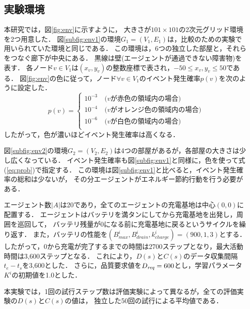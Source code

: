 \documentclass[12pt,a4j,twoside]{jarticle}
\def\AgentSet{A}
\def\Dreq{{D_{\it req}}}
\begin{document}
  \subsection{実験環境}
  本研究では，図\ref{fig:env}に示すように，
  大きさが$101 \times 101$の2次元グリッド環境を2つ用意した．
  図\ref{subfig:env1}の環境$G_1=(V_1, E_1)$は，比較のため\cite{Wu2019}の実験で用いられていた環境と同じである．
  この環境は，6つの独立した部屋と，それらをつなぐ廊下が中央にある．
  黒線は壁(エージェントが通過できない障害物)を表す．
  各ノード$v \in V_1$は$(x_v, y_v)$の整数座標で表され，$-50 \leq x_v,y_v \leq 50$である．
  図\ref{fig:env}の色に従って，ノード$\forall v\in V_1$のイベント発生確率$p(v)$を次のように設定した．
  \begin{equation}
    p(v) = 
    \begin{cases}
      10^{-3}\ & \textrm{($v$が赤色の領域内の場合)}\\
      10^{-4}\ & \textrm{($v$がオレンジ色の領域内の場合)}\\
      10^{-6}\ & \textrm{($v$が白色の領域内の場合)}\\
    \end{cases}
    \label{eq:prob}
  \end{equation}
  したがって，色が濃いほどイベント発生確率は高くなる．
  \par

  図\ref{subfig:env2}の環境$G_2=(V_2, E_2)$は4つの部屋があるが，各部屋の大きさは少し広くなっている．
  イベント発生確率も図\ref{subfig:env1}と同様に，色を使って式(\ref{eq:prob})で指定する．
  この環境は図\ref{subfig:env1}と比べると，イベント発生確率の総和は少ないが，
  その分エージェントがエネルギー節約行動を行う必要がある．
  \par
  
  エージェント数$\vert \AgentSet \vert$は20であり，全てのエージェントの充電基地は中心$(0, 0)$に配置する．
  エージェントはバッテリを満タンにしてから充電基地を出発し，周囲を巡回して，
  バッテリ残量が0になる前に充電基地に戻るというサイクルを繰り返す．
  また，バッテリの性能を$(B^i_{max}, B^i_{drain}, k^i_{charge}) = (900, 1, 3)$とする．
  したがって，0から充電が完了するまでの時間は2700ステップとなり，最大活動時間は3,600ステップとなる．
  これにより，$D(s)$と$C(s)$のデータ収集間隔$t_e - t_s$を3,600とした．
  さらに，品質要求値を$\Dreq=600$とし，学習パラメータ $K^i$の初期値を1.0とした．
  \par

  本実験では，1回の試行ステップ数は評価実験によって異なるが，全ての評価実験の$D(s)$と$C(s)$の値は，
  独立した50回の試行による平均値である．
\end{document}

